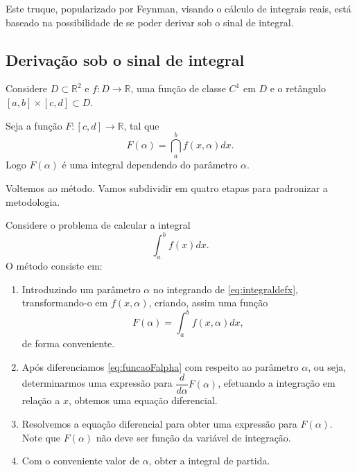 Este truque, popularizado por Feynman, visando o cálculo de integrais reais, está baseado na possibilidade de se poder derivar sob o sinal de integral.

\subsection{Derivação sob o sinal de integral}


Considere $D \subset \mathbb{R}^{2}$ e $f: D \to \mathbb{R}$, uma função de classe $C^{1}$ em $D$ e o retângulo $[a, b] \times [c, d] \subset D$.

Seja a função
$F: [c, d] \to \mathbb{R}$, tal que
\begin{equation}
\label{eq:01}
F(\alpha) = \dint_{a}^{b} f(x, \alpha) dx.
\end{equation}
Logo $F(\alpha)$ é uma integral dependendo do parâmetro $\alpha$.



Voltemos ao método. Vamos subdividir em quatro etapas para padronizar a metodologia.

Considere o problema de calcular a integral
\begin{equation}\label{eq:integraldefx}
\displaystyle\int_{a}^{b} f(x) dx.
\end{equation}
O método consiste em:
\begin{enumerate}
\item Introduzindo um parâmetro $\alpha$ no integrando de \eqref{eq:integraldefx}, transformando-o em $f(x,\alpha)$, criando, assim uma função
\begin{equation}\label{eq:funcaoFalpha}
F(\alpha) = \displaystyle\int_{a}^{b} f(x, \alpha) dx,
\end{equation}
de forma conveniente.
\item Após diferenciamos \eqref{eq:funcaoFalpha} com respeito ao parâmetro \(\alpha\), ou seja, determinarmos uma expressão para $\dfrac{d}{d\alpha} F(\alpha)$, efetuando a integração em relação a $x$, obtemos uma equação diferencial.

\item Resolvemos a equação diferencial para obter uma expressão para $F(\alpha)$. Note que $F(\alpha)$ não deve ser função da variável de integração.

\item Com o conveniente valor de $\alpha$, obter a integral de partida.
\end{enumerate}

